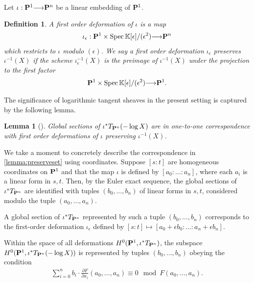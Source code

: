 \documentclass[12pt,reqno]{amsart}
\theoremstyle{plain}
\newtheorem{lemma}[theorem]{Lemma}
\newtheorem{definition}[theorem]{Definition}
\theoremstyle{remark}
\numberwithin{equation}{section}
\renewcommand{\k}{k}
\renewcommand{\to}{{\longrightarrow}}
\renewcommand {\P}{{\bf P}}
\numberwithin{equation}{section}
\renewcommand{\k}{\mathbb K}
\newcommand{\Spec}{{\text{\rm Spec}\,}}
\begin{document}
Let $\iota: \P^{1} \to \P^{n}$ be a linear embedding of $\P^{1}$.
\begin{definition}
  \label{def:deformation}
  A {\sl first order deformation} of $\iota$ is a map
\begin{align}
\iota_{\epsilon}: \P^{1} \times \Spec \k[\epsilon]/(\epsilon^{2}) \to
  \P^{n}
\end{align}
which restricts to $\iota$ modulo $(\epsilon)$. We say a first order
deformation $\iota_{\epsilon}$ {\sl preserves $\iota^{-1}(X)$} if the
scheme $\iota_{\epsilon}^{-1}(X)$ is the preimage of $\iota^{-1}(X)$
under the projection to the first factor
\[\P^{1} \times \Spec \k[\epsilon]/(\epsilon^{2}) \to \P^{1}.\]
\end{definition}

The significance of logarithmic tangent sheaves in the present setting
is captured by the following lemma.

\begin{lemma}[{\cite[Lemma 2.1]{PRT20}}]
  \label{lemma:preserveset} Global sections of
  $\iota^{*}T_{\P^{n}}(- \log X)$ are in one-to-one correspondence
  with first order deformations of $\iota$ preserving $\iota^{-1}(X)$.
\end{lemma}


We take a moment to concretely describe the correspondence in
\autoref{lemma:preserveset} using coordinates.  Suppose $[s:t]$ are
homogeneous coordinates on $\P^1$ and that the map $\iota$ is defined
by $[a_0: \hdots : a_n]$, where each $a_i$ is a linear form in $s,t$.
Then, by the Euler exact sequence, the global sections of
$\iota^{*}T_{\P^{n}}$ are identified with tuples $(b_0, \dots, b_n)$
of linear forms in $s,t$, considered modulo the tuple
$(a_0, \dots, a_n)$.

A global section of $\iota^{*}T_{\P^{n}}$ represented by such a tuple
$(b_0, \dots, b_n)$ corresponds to the first-order deformation
$\iota_{\epsilon}$ defined by
$[s:t] \mapsto [a_0 + \epsilon b_0 : \hdots : a_n + \epsilon b_n]$.

Within the space of all deformations
$H^{0}(\P^{1},\iota^{*}T_{\P^{n}})$, the subspace
$H^{0}(\P^{1},\iota^{*}T_{\P^{n}}(- \log X))$ is represented by tuples
$(b_0, \dots, b_n)$ obeying the condition
\begin{align}
  \label{eq:eulersyz}
  \sum \limits_{i=0}^{n} b_i \cdot \frac{\partial F}{\partial x_{i}}(a_0, \dots, a_{n}) \equiv 0 \mod F(a_0, \dots, a_n).
\end{align}
\end{document}
